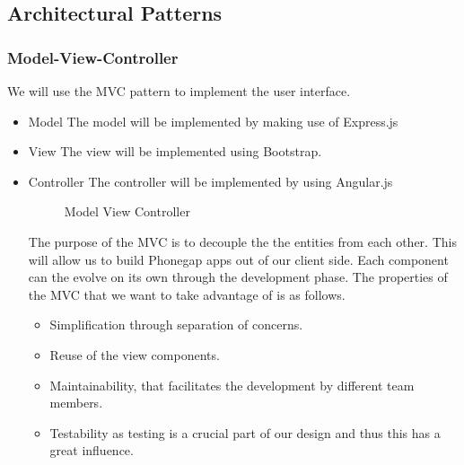 \subsection{Architectural Patterns}
\subsubsection{Model-View-Controller}
We will use the MVC pattern to implement the user interface.
\begin{itemize}
	\item{Model}
	\newline
	The model will be implemented by making use of Express.js
	\item{View}
	\newline
	The view will be implemented using Bootstrap.
	\item{Controller}
	\newline
	The controller will be implemented by using Angular.js
	\begin{figure}[H]
	    	\centering
	    	\caption{Model View Controller}
	    	\label{fig:Learning rate 0.1}
   	\end{figure}
	The purpose of the MVC is to decouple the the entities from each other. This will allow us to build Phonegap apps out of our client side. Each component can the evolve on its own through the development phase. 
	The properties of the MVC that we want to take advantage of is as follows.
	\begin{itemize}
		\item Simplification through separation of concerns.
		\item Reuse of the view components.
		\item Maintainability, that facilitates the development by different team members.
		\item Testability as testing is a crucial part of our design and thus this has a great influence.
	\end{itemize}
\end{itemize}